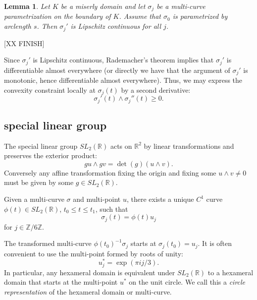 \documentclass[11pt]{amsart}
\newtheorem{lemma}{Lemma}
\newcommand{\ring}[1]{\mathbb{#1}}
\begin{document}
\begin{lemma}
Let $K$ be a miserly domain and let $\sigma_j$ be a multi-curve parametrization on the boundary of $K$.  Assume that $\sigma_0$ is parametrized by arclength $s$.  Then $\sigma_j'$ is Lipschitz continuous for all $j$.
\end{lemma}

[XX FINISH]

Since $\sigma_j'$ is Lipschitz continuous, Rademacher's theorem implies that
$\sigma_j'$ is differentiable almost everywhere (or directly we have that the argument of $\sigma_j'$ is monotonic, hence differentiable almost everywhere).  
Thus, we may express
the convexity constraint locally at $\sigma_j(t)$ by a second derivative:
$$
\sigma_j'(t)\land \sigma_j''(t) \ge 0.
$$



\subsection{special linear group}





The special linear group
$SL_2(\ring{R})$ acts on $\ring{R}^2$ by linear transformations and preserves the
exterior product:
   $$
    {g u}\land{ g v}= \det(g)({u\land v}) .
   $$
Conversely any affine transformation fixing the origin and fixing some
${u}\land{v}\ne 0$ must be given by some $g\in SL_2(\ring{R})$.  


Given a multi-curve $\sigma$ and multi-point
$u$, 
there 
exists a unique $C^1$ curve
$\phi(t)\in SL_2(\ring{R})$, $t_0\le t \le t_1$, such that 
   \begin{equation}\label{eqn:sigma-phi}
   \sigma_j(t) = \phi(t) u_j
   \end{equation}
for $j\in \ring{Z}/6\ring{Z}$.

The transformed multi-curve $\phi(t_0)^{-1} \sigma_j$
starts at 
$\sigma_j(t_0) = u_j$.
It is often convenient to use the multi-point formed by roots of unity:
\begin{equation}\label{eqn:roots}
u^*_j = \exp(\pi i j/3).
\end{equation}
In particular, any hexameral domain is equivalent under $SL_2(\ring{R})$
to a hexameral domain that starts at the multi-point $u^*$ on the
unit circle.  We call this a {\it circle representation} of the
hexameral domain or multi-curve.
\end{document}
